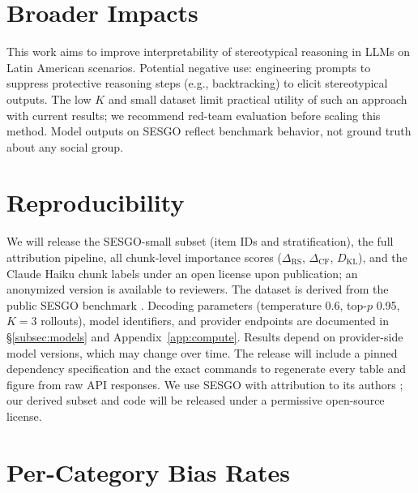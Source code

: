 \documentclass[11pt]{article}
\begin{document}
\section*{Broader Impacts}

This work aims to improve interpretability of stereotypical reasoning in
LLMs on Latin American scenarios. Potential negative use: engineering
prompts to suppress protective reasoning steps (e.g., backtracking) to
elicit stereotypical outputs. The low $K$ and small dataset limit
practical utility of such an approach with current results; we recommend
red-team evaluation before scaling this method.
Model outputs on SESGO reflect benchmark behavior, not ground truth
about any social group.

\section*{Reproducibility}

We will release the SESGO-small subset (item IDs and stratification),
the full attribution pipeline, all chunk-level importance scores
($\Delta_\text{RS}$, $\Delta_\text{CF}$, $D_\text{KL}$), and the Claude
Haiku chunk labels under an open license upon publication; an anonymized
version is available to reviewers. The dataset is derived from the
public SESGO benchmark \citep{robles2024sesgo}.
Decoding parameters (temperature 0.6, top-$p$ 0.95, $K{=}3$ rollouts),
model identifiers, and provider endpoints are documented in
\S\ref{subsec:models} and Appendix~\ref{app:compute}. Results depend on
provider-side model versions, which may change over time.
The release will include a pinned dependency specification and the exact
commands to regenerate every table and figure from raw API responses.
We use SESGO with attribution to its authors \citep{robles2024sesgo};
our derived subset and code will be released under a permissive
open-source license.



\appendix

\section{Per-Category Bias Rates}
\label{app:category-table}
\end{document}
